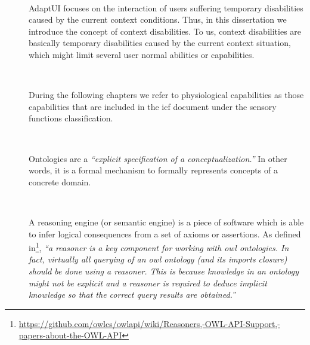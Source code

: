 \begin{description}
  \item[] \hfill \\
  \begin{mdframed}[hidealllines=true,backgroundcolor=gray!20]
  AdaptUI focuses on the interaction of users suffering temporary disabilities 
  caused by the current context conditions. Thus, in this dissertation we 
  introduce the concept of context disabilities. To us, context disabilities 
  are basically temporary disabilities caused by the current context situation, 
  which might limit several user normal abilities or capabilities.
  \end{mdframed}

  \item[] \hfill \\
  \begin{mdframed}[hidealllines=true,backgroundcolor=gray!20]
  During the following chapters we refer to physiological capabilities as those 
  capabilities that are included in the \ac{icf} document under the sensory 
  functions classification.
  \end{mdframed}
 
  \item[] \hfill \\
  \begin{mdframed}[hidealllines=true,backgroundcolor=gray!20]
  Ontologies are a \textit{``explicit specification of a conceptualization.''} 
  In other words, it is a formal mechanism to formally represents concepts of a 
  concrete domain.
  \end{mdframed}
  
  \item[] \hfill \\
  \begin{mdframed}[hidealllines=true,backgroundcolor=gray!20]
  A reasoning engine (or semantic engine) is a piece of software which is able 
  to infer logical consequences from a set of axioms or assertions. As defined
  in\footnote{\url{https://github.com/owlcs/owlapi/wiki/Reasoners,-OWL-API-Support,-papers-about-the-OWL-API}}, \textit{``a reasoner is a key component for working 
  with \ac{owl} ontologies. In fact, virtually all querying of an \ac{owl} ontology 
  (and its imports closure) should be done using a reasoner. This is because 
  knowledge in an ontology might not be explicit and a reasoner is required to 
  deduce implicit knowledge so that the correct query results are obtained.''}
  \end{mdframed}


\end{description}
